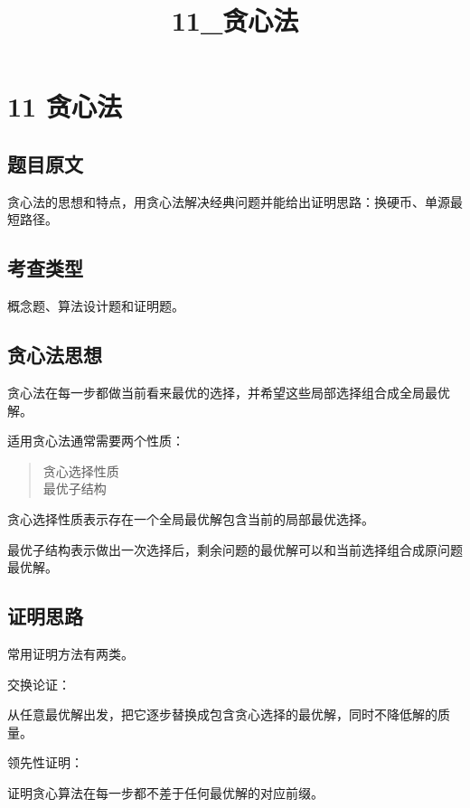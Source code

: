 \documentclass[UTF8,zihao=-4]{ctexart}
\title{11\_贪心法}
\author{}
\date{}
\begin{document}
\maketitle

\section*{11 贪心法}

\subsection*{题目原文}

贪心法的思想和特点，用贪心法解决经典问题并能给出证明思路：换硬币、单源最短路径。

\subsection*{考查类型}

概念题、算法设计题和证明题。

\subsection*{贪心法思想}

贪心法在每一步都做当前看来最优的选择，并希望这些局部选择组合成全局最优解。

适用贪心法通常需要两个性质：

\begin{quote}
\small\ttfamily\raggedright
\relax 贪心选择性质\\
\relax 最优子结构\\
\end{quote}

贪心选择性质表示存在一个全局最优解包含当前的局部最优选择。

最优子结构表示做出一次选择后，剩余问题的最优解可以和当前选择组合成原问题最优解。

\subsection*{证明思路}

常用证明方法有两类。

交换论证：

从任意最优解出发，把它逐步替换成包含贪心选择的最优解，同时不降低解的质量。

领先性证明：

证明贪心算法在每一步都不差于任何最优解的对应前缀。
\end{document}

